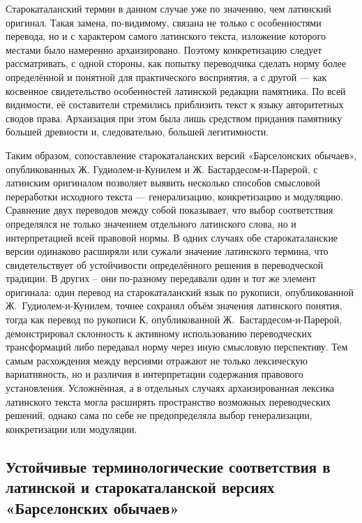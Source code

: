 Старокаталанский термин в данном случае уже по значению, чем латинский оригинал. Такая замена, по-видимому, связана не только с особенностями перевода, но и с характером самого латинского текста, изложение которого местами было намеренно архаизировано. Поэтому конкретизацию следует рассматривать, с одной стороны, как попытку переводчика сделать норму более определённой и понятной для практического восприятия, а с другой --- как косвенное свидетельство особенностей латинской редакции памятника. По всей видимости, её составители стремились приблизить текст к языку авторитетных сводов права. Архаизация при этом была лишь средством придания памятнику большей древности и, следовательно, большей легитимности.

Таким образом, сопоставление старокаталанских версий «Барселонских обычаев», опубликованных Ж. Гудиолем-и-Кунилем и Ж. Бастардесом-и-Парерой, с латинским оригиналом позволяет выявить несколько способов смысловой переработки исходного текста --- генерализацию, конкретизацию и модуляцию. Сравнение двух переводов между собой показывает, что выбор соответствия определялся не только значением отдельного латинского слова, но и интерпретацией всей правовой нормы. В одних случаях обе старокаталанские версии одинаково расширяли или сужали значение латинского термина, что свидетельствует об устойчивости определённого решения в переводческой традиции. В других -- они по-разному передавали один и тот же элемент оригинала: один перевод на старокаталанский язык по рукописи, опубликованной Ж.~Гудиолем-и-Кунилем, точнее сохранял объём значения латинского понятия, тогда как перевод по рукописи К, опубликованной Ж.~Бастардесом-и-Парерой, демонстрировал склонность к активному использованию переводческих трансформаций либо передавал норму через иную смысловую перспективу. Тем самым расхождения между версиями отражают не только лексическую вариативность, но и различия в интерпретации содержания правового установления. Усложнённая, а в отдельных случаях архаизированная лексика латинского текста могла расширять пространство возможных переводческих решений, однако сама по себе не предопределяла выбор генерализации, конкретизации или модуляции.

\subsection{Устойчивые терминологические соответствия в латинской и старокаталанской версиях «Барселонских обычаев»}

